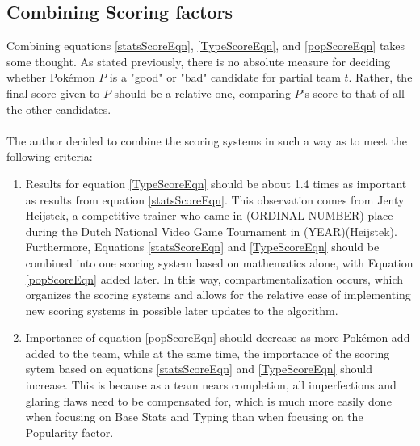 \documentclass{article}
\begin{document}
\subsection{Combining Scoring factors}
Combining equations \ref{statsScoreEqn}, \ref{TypeScoreEqn}, and \ref{popScoreEqn} takes some thought. As stated previously, there is no absolute measure for deciding whether Pok\'emon $P$ is a "good" or "bad" candidate for partial team $t$. Rather, the final score given to $P$ should be a relative one, comparing $P$'s score to that of all the other candidates.\\\\
The author decided to combine the scoring systems in such a way as to meet the following criteria:
\begin{enumerate}
	\item Results for equation \ref{TypeScoreEqn} should be about 1.4 times as important as results from equation \ref{statsScoreEqn}. This observation comes from Jenty Heijstek, a competitive trainer who came in (ORDINAL NUMBER) place during the Dutch National Video Game Tournament in (YEAR)(Heijstek). Furthermore, Equations \ref{statsScoreEqn} and \ref{TypeScoreEqn} should be combined into one scoring system based on mathematics alone, with Equation \ref{popScoreEqn} added later. In this way, compartmentalization occurs, which organizes the scoring systems and allows for the relative ease of implementing new scoring systems in possible later updates to the algorithm.
	\item Importance of equation \ref{popScoreEqn} should decrease as more Pok\'emon add added to the team, while at the same time, the importance of the scoring sytem based on equations \ref{statsScoreEqn} and \ref{TypeScoreEqn} should increase. This is because as a team nears completion, all imperfections and glaring flaws need to be compensated for, which is much more easily done when focusing on Base Stats and Typing than when focusing on the Popularity factor. 
\end{enumerate}
\end{document}

